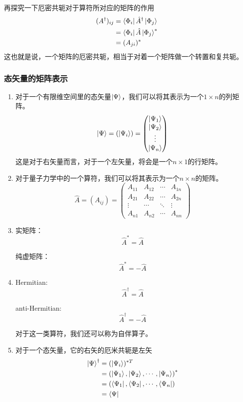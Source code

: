\documentclass{article}
\newcommand{\h}[1]{\hat{#1}}
\begin{document}
\begin{enumerate}
	      再探究一下厄密共轭对于算符所对应的矩阵的作用
	      \begin{align*}
		      (A^\dagger)_{ij} & =\bra{\Phi_i}\h{A}^\dagger\ket{\Phi_j} \\
		                       & =\bra{\Phi_i}\h{A}\ket{\Phi_j}^*       \\
		                       & =(A_{ji})^*
	      \end{align*}
	      这也就是说，一个矩阵的厄密共轭，相当于对着一个矩阵做一个转置和复共轭。
\end{enumerate}

\subsubsection{态矢量的矩阵表示}

\begin{enumerate}
	\item 对于一个有限维空间里的态矢量$\ket{\Psi}$，我们可以将其表示为一个$1\times n$的列矩阵。
	      \[\ket{\Psi}=(\ket{\Psi_i})=
		      \begin{pmatrix}
			      \ket{\Psi_1} \\
			      \ket{\Psi_2} \\
			      \vdots       \\
			      \ket{\Psi_n}
		      \end{pmatrix}
	      \]
	      这是对于右矢量而言，对于一个左矢量，将会是一个$n\times 1$的行矩阵。
	\item 对于量子力学中的一个算符，我们可以将其表示为一个$n\times n$的矩阵。
	      \[
		      \hat{A}=(A_{ij})=
		      \begin{pmatrix}
			      A_{11} & A_{12} & \cdots & A_{1n} \\
			      A_{21} & A_{22} & \cdots & A_{2n} \\
			      \vdots & \cdots & \ddots & \vdots \\
			      A_{n1} & A_{n2} & \cdots & A_{nn}
		      \end{pmatrix}
	      \]
	\item 实矩阵：\[\hat{A}^*=\hat{A}\]

	      纯虚矩阵：\[\hat{A}^*=-\hat{A}\]
	\item Hermitian:\[\hat{A}^\dagger=\hat{A}\]

	      anti-Hermitian:\[\hat{A}^\dagger=-\hat{A}\]

	      对于这一类算符，我们还可以称为自伴算子。
	\item 对于一个态矢量，它的右矢的厄米共轭是左矢
	      \begin{align*}
		      \ket{\Psi}^\dagger & =(\ket{\Psi_i})^{*T}                                            \\
		                         & =\left(\ket{\Psi_1},\ket{\Psi_2},\cdots,\ket{\Psi_n}\right)^{*} \\
		                         & =\left(\bra{\Psi_1},\bra{\Psi_2},\cdots,\bra{\Psi_n}\right)     \\
		                         & =\bra{\Psi}
	      \end{align*}


\end{enumerate}
\end{document}
